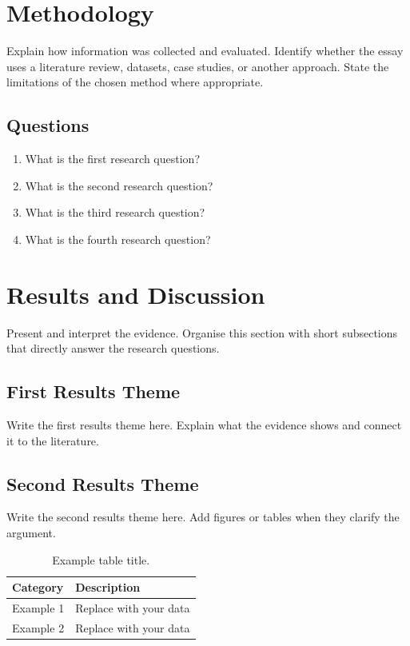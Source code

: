 \documentclass[12pt,letterpaper]{article}
\begin{document}
\section{Methodology}
\label{sec:methodology}
Explain how information was collected and evaluated. Identify whether the
essay uses a literature review, datasets, case studies, or another approach.
State the limitations of the chosen method where appropriate.

\subsection*{Questions}
\begin{enumerate}
  \item What is the first research question?
  \item What is the second research question?
  \item What is the third research question?
  \item What is the fourth research question?
\end{enumerate}

\section{Results and Discussion}
\label{sec:results}
Present and interpret the evidence. Organise this section with short
subsections that directly answer the research questions.

\subsection{First Results Theme}
Write the first results theme here. Explain what the evidence shows and
connect it to the literature.

\subsection{Second Results Theme}
Write the second results theme here. Add figures or tables when they clarify
the argument.

\begin{table}[htbp]
  \centering
  \caption{Example table title.}
  \label{tab:example}
  \begin{tabular}{ll}
    \toprule
    Category & Description \\
    \midrule
    Example 1 & Replace with your data \\
    Example 2 & Replace with your data \\
    \bottomrule
  \end{tabular}
\end{table}
\end{document}
